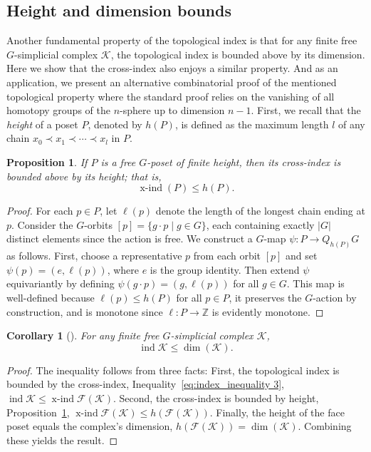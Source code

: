 \documentclass[preprint,12pt]{article}
\renewcommand{\le}{\leqslant}
\newtheorem{proposition}[theorem]{Proposition}
\newtheorem{corollary}[theorem]{Corollary}
\theoremstyle{definition}
\theoremstyle{remark}
\numberwithin{equation}{section}
\DeclareMathOperator{\ind}{ind}
\DeclareMathOperator{\xind}{x-ind}
\begin{document}
\subsection{Height and dimension bounds}

\label{Subsection: Dimension}

Another fundamental property of the topological index is that for any finite free $G$-simplicial complex $\mathcal{K}$, the topological index is bounded above by its dimension. Here we show that the cross-index also enjoys a similar property. And as an application,  we present an alternative combinatorial proof of the mentioned topological property where the standard proof relies on the vanishing of all homotopy groups of the $n$-sphere up to dimension $n-1$. First, we recall that the \emph{height} of a poset $P$, denoted by $h(P)$, is defined as the maximum length $l$ of any chain $x_0 \prec x_1 \prec \cdots \prec x_l$ in $P$.

\begin{proposition}\label{prop:dimension_bound}
If $P$ is a free $G$-poset of finite height, then its cross-index is bounded above by its height; that is,
\[
\xind(P) \le h(P).
\]
\end{proposition}

\begin{proof}
For each $p \in P$, let $\ell(p)$ denote the length of the longest chain ending at $p$. Consider the $G$-orbits $[p] = \{g\cdot p \mid g \in G\}$, each containing exactly $|G|$ distinct elements since the action is free. We construct a $G$-map $\psi\colon P \to Q_{h(P)}G$ as follows. First, choose a representative $p$ from each orbit $[p]$ and set $\psi(p) = (e, \ell(p))$, where $e$ is the group identity. Then extend $\psi$ equivariantly by defining $\psi(g\cdot p) = (g, \ell(p))$ for all $g \in G$. This map is well-defined because $\ell(p) \le h(P)$ for all $p \in P$, it preserves the $G$-action by construction, and is monotone since $\ell : P\to \mathbb Z$ is evidently monotone.
\end{proof}

\begin{corollary}[{\cite[Proposition 6.2.4]{matouvsek2003using}}]
\label{cor:top_dim_bound}
For any finite free $G$-simplicial complex $\mathcal{K}$,
\[
\ind \mathcal{K} \le \dim(\mathcal{K}).
\]
\end{corollary}

\begin{proof}
The inequality follows from three facts: First, the topological index is bounded by the cross-index, Inequality~\ref{eq:index_inequality 3}, $\ind \mathcal{K} \le \xind \mathcal{F}(\mathcal{K})$. Second, the cross-index is bounded by height, Proposition~\ref{prop:dimension_bound}, $\xind \mathcal{F}(\mathcal{K}) \le h(\mathcal{F}(\mathcal{K}))$. Finally, the height of the face poset equals the complex's dimension, $h(\mathcal{F}(\mathcal{K})) = \dim(\mathcal{K})$. Combining these yields the result.
\end{proof}
\end{document}

